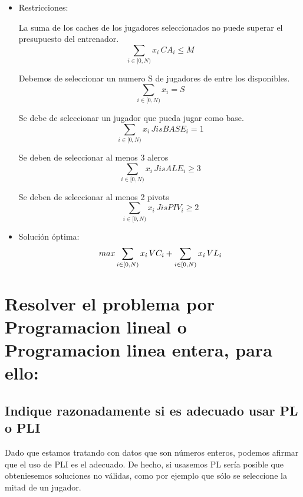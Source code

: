 \documentclass[a4paper,12pt]{article}
\begin{document}
\begin{itemize}
 \item Restricciones:

La suma de los caches de los jugadores seleccionados no puede superar el presupuesto del entrenador.
\begin{equation}
\sum_{i \in [0,N)}{x_i \, CA_i} \leq M
\end{equation}

Debemos de seleccionar un numero S de jugadores de entre los disponibles.
\begin{equation}
\sum_{i \in [0,N)}{x_i} = S
\end{equation}

Se debe de seleccionar un jugador que pueda jugar como base.
\begin{equation}
\sum_{i \in [0,N)}{x_i \, JisBASE_i} = 1
\end{equation}

Se deben de seleccionar al menos 3 aleros
\begin{equation}
\sum_{i \in [0,N)}{x_i \, JisALE_i} \geq 3
\end{equation}

Se deben de seleccionar al menos 2 pivots\\
\begin{equation}
\sum_{i \in [0,N)}{x_i \, JisPIV_i} \geq 2
\end{equation}


\item Solución óptima:\\
\begin{equation*}
max  \sum_{i \in [0,N)}{x_i \, VC_i}+\sum_{i \in [0,N)}{x_i \, VL_i}\\
\end{equation*}

\end{itemize}

\section{Resolver el problema por Programacion lineal o Programacion linea entera, para ello:}

\subsection{Indique razonadamente si es adecuado usar PL o PLI}
Dado que estamos tratando con datos que son números enteros, podemos afirmar que el uso de PLI
es el adecuado. De hecho, si usasemos PL sería posible que obteniesemos soluciones no válidas,
como por ejemplo que sólo se seleccione la mitad de un jugador.
\end{document}
